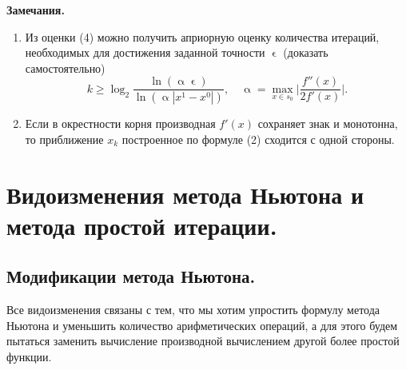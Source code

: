 \documentclass[a4paper, 12pt]{report}
\renewcommand{\geq}{\geqslant}
\renewcommand{\alpha}{\upalpha}
\renewcommand{\epsilon}{\upvarepsilon}
\begin{document}
	\textbf{Замечания.}\begin{enumerate}
		\item Из оценки (4) можно получить априорную оценку количества итераций, необходимых для достижения заданной точности $\epsilon$ (доказать самостоятельно)
		$$ k \geq \log_2 \dfrac{\ln(\alpha \epsilon)}{\ln(\alpha |x^1 - x^0|)},\quad \alpha = \underset{x\in s_0}{\max}\Big|\dfrac{f''(x)}{2f'(x)}\Big|.$$
		\item Если в окрестности корня производная $f'(x)$ сохраняет знак и монотонна, то приближение $x_k$ построенное по формуле (2) сходится с одной стороны.
	\end{enumerate}
	\section{Видоизменения метода Ньютона и метода простой итерации.}
	\subsection{Модификации метода Ньютона.}
	Все видоизменения связаны с тем, что мы хотим упростить формулу метода Ньютона и уменьшить количество арифметических операций, а для этого будем пытаться заменить вычисление производной вычислением другой более простой функции.
\end{document}
